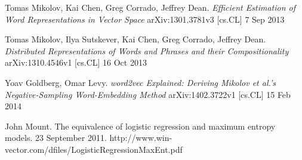 \documentclass[]{article}
\begin{document}
\begin{thebibliography}{1}
	 Tomas Mikolov, Kai Chen, Greg Corrado, Jeffrey Dean. {\em Efficient Estimation of Word Representations in Vector Space} arXiv:1301.3781v3 [cs.CL] 7 Sep 2013
	
	 Tomas Mikolov, Ilya Sutskever, Kai Chen, Greg Corrado, Jeffrey Dean. {\em Distributed Representations of Words and Phrases and their Compositionality} arXiv:1310.4546v1  [cs.CL]  16 Oct 2013
	
	 Yoav Goldberg, Omar Levy. {\em word2vec Explained: Deriving Mikolov et al.'s Negative-Sampling Word-Embedding Method} arXiv:1402.3722v1  [cs.CL]  15 Feb 2014
	
	 John Mount. The equivalence of logistic regression and maximum entropy
	models. 23 September 2011. http://www.win-vector.com/dfiles/LogisticRegressionMaxEnt.pdf
	
\end{thebibliography}
\end{document}
